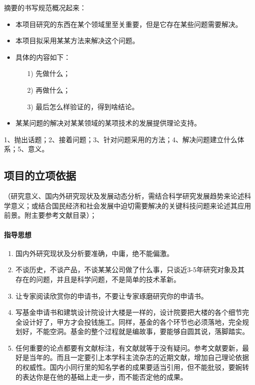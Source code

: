 摘要的书写规范概况起来：
\begin{itemize}
\item 本项目研究的东西在某个领域里至关重要，但是它存在某些问题需要解决。
\item 本项目拟采用某某方法来解决这个问题。
\item 具体的内容如下：
	\begin{itemize}
	\item[1)] 先做什么；
	\item[2)] 再做什么；
	\item[3)] 最后怎么样验证的，得到啥结论。
	\end{itemize}
\item 某某问题的解决对某某领域的某项技术的发展提供理论支持。
\end{itemize}

1、抛出话题；2、接着问题；3、针对问题采用的方法；4、解决问题建立什么体系；5、意义。


\subsection{项目的立项依据}
（研究意义、国内外研究现状及发展动态分析，需结合科学研究发展趋势来论述科学意义；或结合国民经济和社会发展中迫切需要解决的关键科技问题来论述其应用前景。附主要参考文献目录）；

\paragraph{指导思想}
\begin{enumerate}
\item 国内外研究现状及分析要准确，中庸，绝不能偏激。
\item 不谈历史，不谈产品，不谈某某公司做了什么事，只谈近3-5年研究对象及其存在的问题，并且是科学问题，不是简单的技术革新。
\item 让专家阅读欣赏你的申请书，不要让专家琢磨研究你的申请书。
\item 写基金申请书和建筑设计院设计大楼是一样的，设计院要把大楼的各个细节完全设计好了，甲方才会投钱施工。同样，基金的各个环节也必须落地，完全规划好，不能空洞。基金的整个过程就是编故事，要能够自圆其说，落脚踏实。
\item 任何重要的论点都要有文献标注，有文献就等于没有疑问。参考文献要新，最好是当年的。而且一定要引上本学科主流杂志的近期文献，增加自己理论依据的权威性。国内小同行里的知名学者的成果要适当引用，但不能批驳，要婉转的表达你是在他的基础上走一步，而不能否定他的成果。
\end{enumerate}


